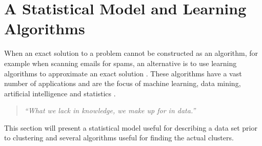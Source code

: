 \section{A Statistical Model and Learning Algorithms}
When an exact solution to a problem cannot be constructed as an algorithm, for example when scanning emails for spams, an alternative is to use learning algorithms to approximate an exact solution \parencite{Alpaydin2010}. These algorithms have a vast number of applications and are the focus of machine learning, data mining, artificial intelligence and statistics \parencite{Hastie2001}. 
\begin{quote}
\emph{``What we lack in knowledge, we make up for in data.''} \parencite{Alpaydin2010}
\end{quote}
This section will present a statistical model useful for describing a data set prior to clustering and several algorithms useful for finding the actual clusters.

